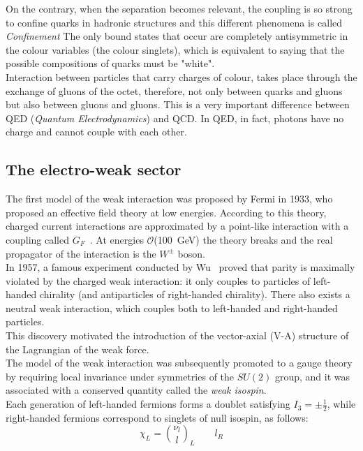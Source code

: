 On the contrary, when the separation becomes relevant, the coupling is so strong to confine quarks in hadronic  structures and this different phenomena is called \textit{Confinement}
The only bound states that occur are completely antisymmetric in the colour variables (the colour singlets), which is equivalent to saying that the possible compositions of quarks must be "white".\\
Interaction between particles that carry charges of colour, takes place through the exchange of gluons of the octet, therefore, not only between quarks and gluons but also between gluons and gluons. This is a very important difference between QED (\textit{Quantum Electrodynamics}) and QCD. In QED, in fact, photons have no charge and cannot couple with each other.

\subsection{The electro-weak sector}
\label{sec:ew}
The first model of the weak interaction was proposed by Fermi in 1933, who proposed an effective field theory at low energies. According to this theory, 
charged current interactions are approximated by a point-like interaction with a coupling called $G_F$~\cite{fermi,wilson}.
At energies $\mathcal{O}$(100~GeV) the theory breaks and the real propagator of the interaction is the $W^\pm$ boson.\\
In 1957, a famous experiment conducted by Wu~\cite{wu} proved that parity is maximally violated by the charged
weak interaction: it only couples to particles of left-handed chirality (and antiparticles of right-handed chirality). There also exists a neutral weak interaction, which couples both
to left-handed and right-handed particles. \\
This discovery motivated the introduction of the vector-axial (V-A) structure of the Lagrangian of the weak force. \\
The model of the weak interaction was subsequently promoted to a gauge theory by requiring local invariance under symmetries of the $SU(2)$ group, and it was associated
with a conserved quantity called the \textit{weak isospin}.
\vspace{\baselineskip}
\\Each generation of left-handed fermions forms a doublet satisfying $I_{3}= \pm\frac{1}{2}$, while right-handed fermions correspond to singlets of null isospin, as follows:
\begin{equation} 
\chi_{L}=\binom{\nu_l}{l}_L  \qquad l_R
\end{equation}
